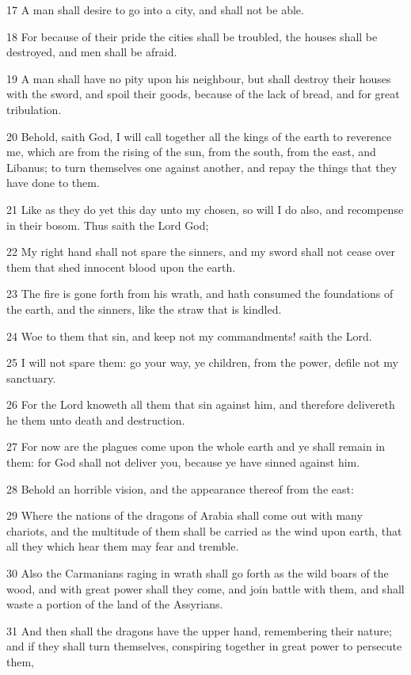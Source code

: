 \par 17 A man shall desire to go into a city, and shall not be able.
\par 18 For because of their pride the cities shall be troubled, the houses shall be destroyed, and men shall be afraid.
\par 19 A man shall have no pity upon his neighbour, but shall destroy their houses with the sword, and spoil their goods, because of the lack of bread, and for great tribulation.
\par 20 Behold, saith God, I will call together all the kings of the earth to reverence me, which are from the rising of the sun, from the south, from the east, and Libanus; to turn themselves one against another, and repay the things that they have done to them.
\par 21 Like as they do yet this day unto my chosen, so will I do also, and recompense in their bosom. Thus saith the Lord God;
\par 22 My right hand shall not spare the sinners, and my sword shall not cease over them that shed innocent blood upon the earth.
\par 23 The fire is gone forth from his wrath, and hath consumed the foundations of the earth, and the sinners, like the straw that is kindled.
\par 24 Woe to them that sin, and keep not my commandments! saith the Lord.
\par 25 I will not spare them: go your way, ye children, from the power, defile not my sanctuary.
\par 26 For the Lord knoweth all them that sin against him, and therefore delivereth he them unto death and destruction.
\par 27 For now are the plagues come upon the whole earth and ye shall remain in them: for God shall not deliver you, because ye have sinned against him.
\par 28 Behold an horrible vision, and the appearance thereof from the east:
\par 29 Where the nations of the dragons of Arabia shall come out with many chariots, and the multitude of them shall be carried as the wind upon earth, that all they which hear them may fear and tremble.
\par 30 Also the Carmanians raging in wrath shall go forth as the wild boars of the wood, and with great power shall they come, and join battle with them, and shall waste a portion of the land of the Assyrians.
\par 31 And then shall the dragons have the upper hand, remembering their nature; and if they shall turn themselves, conspiring together in great power to persecute them,
